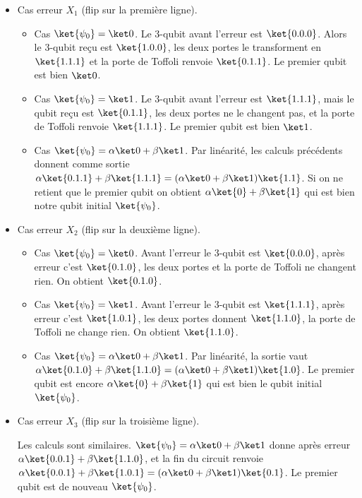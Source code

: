 \documentclass[11pt,class=report,crop=false]{standalone}
\begin{document}
\begin{itemize}
  \item Cas erreur $X_1$ (flip sur la première ligne). 
  
  \begin{itemize}
    \item Cas $\ket{\psi_0}=\ket0$. 
    Le $3$-qubit avant l'erreur est $\ket{0.0.0}$.
    Alors le $3$-qubit reçu est $\ket{1.0.0}$, les deux portes  le transforment en $\ket{1.1.1}$ et la porte de Toffoli renvoie $\ket{0.1.1}$. Le premier qubit est bien $\ket0$.

    \item Cas $\ket{\psi_0}=\ket1$. 
    Le $3$-qubit avant l'erreur est $\ket{1.1.1}$, mais le qubit reçu est $\ket{0.1.1}$, les deux portes  ne le changent pas, et la porte de Toffoli renvoie $\ket{1.1.1}$. Le premier qubit est bien $\ket1$.

    \item Cas $\ket{\psi_0}=\alpha\ket0+\beta\ket1$. Par linéarité, les calculs précédents donnent comme sortie $\alpha\ket{0.1.1} + \beta\ket{1.1.1} = (\alpha\ket0+\beta\ket1)\ket{1.1}$. Si on ne retient que le premier qubit on obtient $\alpha\ket{0} + \beta\ket{1}$ qui est bien notre qubit initial $\ket{\psi_0}$.
  \end{itemize}


  \item Cas erreur $X_2$ (flip sur la deuxième ligne). 
  
  \begin{itemize}
    \item Cas $\ket{\psi_0}=\ket0$. 
    Avant l'erreur le $3$-qubit est $\ket{0.0.0}$, après erreur c'est $\ket{0.1.0}$, les deux portes  et la porte de Toffoli ne changent rien. On obtient $\ket{0.1.0}$. 

    \item Cas $\ket{\psi_0}=\ket1$. 
    Avant l'erreur le $3$-qubit est $\ket{1.1.1}$, après erreur c'est $\ket{1.0.1}$, les deux portes  donnent $\ket{1.1.0}$, la porte de Toffoli ne change rien. On obtient $\ket{1.1.0}$. 
 
    \item Cas $\ket{\psi_0}=\alpha\ket0+\beta\ket1$. Par linéarité, la sortie vaut $\alpha\ket{0.1.0} + \beta\ket{1.1.0} = (\alpha\ket0+\beta\ket1)\ket{1.0}$. Le premier qubit est encore $\alpha\ket{0} + \beta\ket{1}$ qui est bien le qubit initial $\ket{\psi_0}$.
  \end{itemize}

  \item Cas erreur $X_3$ (flip sur la troisième ligne). 

  Les calculs sont similaires. $\ket{\psi_0}=\alpha\ket0+\beta\ket1$
  donne après erreur $\alpha\ket{0.0.1}+\beta\ket{1.1.0}$, et la fin du circuit renvoie
  $\alpha\ket{0.0.1}+\beta\ket{1.0.1} = (\alpha\ket0+\beta\ket1)\ket{0.1}$. Le premier qubit est de nouveau $\ket{\psi_0}$.

\end{itemize}
\end{document}
